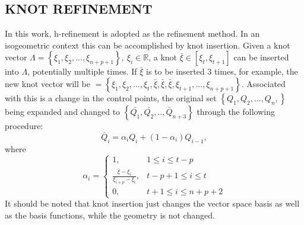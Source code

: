 \documentclass[review]{elsarticle}
\begin{document}
\subsection{KNOT REFINEMENT}
In this work, h-refinement is adopted as the refinement method. In an isogeometric context this can be accomplished by knot insertion. Given a knot vector $\Lambda=\left\{\xi_1,\xi_2,...,\xi_{n+p+1}\right\},\ \xi_i\in\mathbb{R}$, a knot $\bar{\xi}\in[\xi_t,\xi_{t+1}]$ can be inserted into $\Lambda$, potentially multiple times. If $\bar{\xi}$ is to be inserted 3 times, for example, the new knot vector will be $ =\left\{\xi_1,\xi_2,...,\xi_t,\bar{\xi},\bar{\xi},\bar{\xi},\xi_{t+1},...,\xi_{n+p+1}\right\}$. Associated with this is a change in the control points, the original set $\left\{Q_1,Q_2,...,Q_n,\right\}$ being expanded and changed to $\left\{\bar{Q_1},\bar{Q_2},..,\bar{Q}_{n+3}\right\}$ through the following procedure:
\begin{equation}
\bar{Q}_i=\alpha_iQ_i+(1-\alpha_i)Q_{i-1},
\end{equation}
where
\begin{equation}
\alpha_i=\left\{
\begin{array}{rcl}
1,  &  1\leq i\leq{t-p}  \\
\frac{\bar{\xi}-\xi_{i}}{\xi_{i+p}-\xi_{i}},  &  t-p+1\leq i\leq t  \\
0,  &  t+1\leq i\leq{n+p+2}
\end{array}\right.
\end{equation}
It should be noted that knot insertion just changes the vector space basis as well as the basis functions, while the geometry is not changed.
\end{document}
